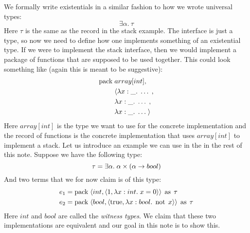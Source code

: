 We formally write existentials in a similar fashion to how we wrote universal types:
\[
  \exists \alpha. \: \tau
\]
Here $\tau$ is the same as the record in the stack example. The interface is just a type, so now we need to define how one implements something of an existential type. If we were to implement the stack interface, then we would implement a package of functions that are supposed to be used together. This could look something like (again this is meant to be suggestive):
\begin{align*}
  \operatorname{pack}\; &array[int], \\
         & \langle \lambda x:\_.\; \dots\;,\\
         & \lambda x:\_.\; \dots\;,\\
         & \lambda x:\_.\; \dots\; \rangle
\end{align*}
Here $array[int]$ is the type we want to use for the concrete implementation and the record of functions is the concrete implementation that uses $array[int]$ to implement a stack. Let us introduce an example we can use in the in the rest of this note. Suppose we have the following type:
\[
  \tau = \exists \alpha. \; \alpha \times ( \alpha \rightarrow bool)
\]
And two terms that we for now claim is of this type:
\begin{align*}
  e_1 & = \operatorname{pack} \; \langle int,\langle 1, \lambda x : int . \; x=0 \rangle \rangle \; \operatorname{as} \; \tau \\
  e_2 & = \operatorname{pack} \; \langle bool,\langle \text{true}, \lambda x : bool . \; \operatorname{not}\; x \rangle \rangle \; \operatorname{as} \; \tau
\end{align*}
Here $int$ and $bool$ are called the \emph{witness types}. We claim that these two implementations are equivalent and our goal in this note is to show this. 

